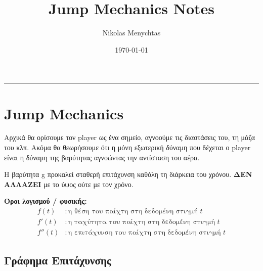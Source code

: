 \documentclass[11pt,a4paper]{article}
\title{\textbf{\Huge Jump Mechanics Notes}}
\author{\Large Nikolas Menychtas}
\date{\today}
\begin{document}
\maketitle
\hrule
\vspace{15pt}

\section{Jump Mechanics}

Αρχικά θα ορίσουμε τον \foreignlanguage{english}{player} ως ένα σημείο, αγνοούμε τις διαστάσεις του, τη μάζα του κλπ. Ακόμα θα θεωρήσουμε ότι η μόνη εξωτερική δύναμη που δέχεται ο \foreignlanguage{english}{player} είναι η δύναμη της βαρύτητας αγνοώντας την αντίσταση του αέρα.

\vspace{5pt}
Η βαρύτητα \foreignlanguage{english}{g} προκαλεί σταθερή επιτάχυνση καθόλη τη διάρκεια του χρόνου. \textbf{ΔΕΝ ΑΛΛΑΖΕΙ} με το ύψος ούτε με τον χρόνο.

\bigskip
\textbf{Όροι λογισμού / φυσικής:}
\begin{align*}
f(t) &: \text{η θέση του παίχτη στη δεδομένη στιγμή } t \\
f'(t) &: \text{η ταχύτητα του παίχτη στη δεδομένη στιγμή } t \\
f''(t) &: \text{η επιτάχυνση του παίχτη στη δεδομένη στιγμή } t
\end{align*}
\vspace{5pt}

\subsection*{Γράφημα Επιτάχυνσης}

\begin{center}
\end{center}
\end{document}
